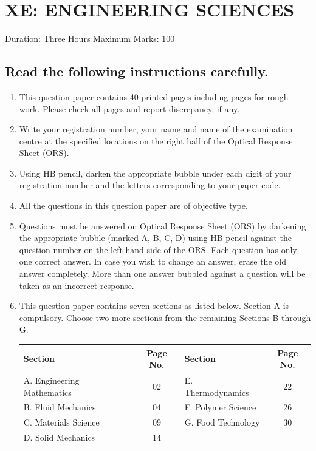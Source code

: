 \documentclass[journal,12pt,onecolumn]{IEEEtran}
\theoremstyle{remark}
\begin{document}
\section*{\hspace{1cm}XE: ENGINEERING SCIENCES}

     Duration: Three Hours \hspace{2.5 cm}  Maximum Marks: 100



\subsection*{Read the following instructions carefully.}


\begin{enumerate}
    \item This question paper contains 40 printed pages including pages for rough work. Please check all pages and report discrepancy, if any.
    \item Write your registration number, your name and name of the examination centre at the specified locations on the right half of the Optical Response Sheet (ORS).
    \item Using HB pencil, darken the appropriate bubble under each digit of your registration number and the letters corresponding to your paper code.
    \item All the questions in this question paper are of objective type.
    \item Questions must be answered on Optical Response Sheet (ORS) by darkening the appropriate bubble (marked A, B, C, D) using HB pencil against the question number on the left hand side of the ORS. Each question has only one correct answer. In case you wish to change an answer, erase the old answer completely. More than one answer bubbled against a question will be taken as an incorrect response.
    \item This question paper contains seven sections as listed below. Section A is compulsory. Choose two more sections from the remaining Sections B through G.
    \begin{center}
\begin{tabularx}{\textwidth}{X|c|X|c}
\hline
\textbf{Section} & \textbf{Page No.} & \textbf{Section} & \textbf{Page No.} \\
\hline
A. Engineering Mathematics & 02 & E. Thermodynamics & 22 \\
B. Fluid Mechanics & 04 & F. Polymer Science & 26 \\
C. Materials Science & 09 & G. Food Technology & 30 \\
D. Solid Mechanics & 14 &  &  \\
\hline
\end{tabularx}
\end{center}


\end{enumerate}
\end{document}
